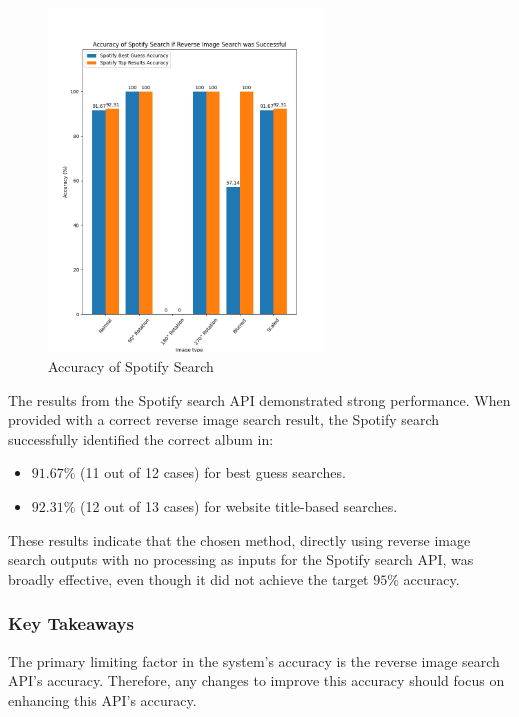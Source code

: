 \begin{figure} [H]
    \centering
    \includegraphics[width=0.65\textwidth]{figures/evaluation_graphs_spotify.png}
    \caption{Accuracy of Spotify Search}
    \label{fig:album-scanning-results-spotify}
\end{figure}

The results from the Spotify search API demonstrated strong performance. When provided with a correct reverse image search result, the Spotify search successfully identified the correct album in:

\begin{itemize}
    \item $91.67\%$ (11 out of 12 cases) for best guess searches.
    \item $92.31\%$ (12 out of 13 cases) for website title-based searches.
\end{itemize}

These results indicate that the chosen method, directly using reverse image search outputs with no processing as inputs for the Spotify search API, was broadly effective, even though it did not achieve the target $95\%$ accuracy.

\subsubsection{Key Takeaways}
The primary limiting factor in the system's accuracy is the reverse image search API's accuracy. Therefore, any changes to improve this accuracy should focus on enhancing this API's accuracy.

